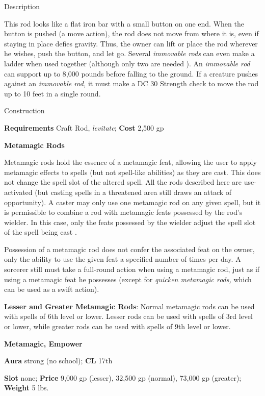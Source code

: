 Description
				
This rod looks like a flat iron bar with a small button on one end. When the button is pushed (a move action), the rod does not move from where it is, even if staying in place defies gravity. Thus, the owner can lift or place the rod wherever he wishes, push the button, and let go. Several \textit{immovable rods }can even make a ladder when used together (although only two 
are needed
). An \textit{immovable rod }can support up to 8,000 pounds before falling to the ground. If a creature pushes against an \textit{immovable rod, }it must make a DC 30 Strength check to move the rod up to 10 feet in a single round. 
				
Construction
				
\textbf{Requirements} Craft Rod, \textit{levitate}; \textbf{Cost }2,500 gp
				
\textbf{Metamagic Rods}
				
Metamagic rods hold the essence of a metamagic feat, allowing the user to apply metamagic effects to spells (but not spell-like abilities) as they are cast. This does not change the spell slot of the altered spell. All the rods described here are use-activated (but casting spells in a threatened area still draws an attack of opportunity). A caster may only use one metamagic rod on any given spell, but it is permissible to combine a rod with metamagic feats possessed by the rod's wielder. In this case, only the feats possessed by the wielder adjust the spell slot of the spell 
being cast
.
				
Possession of a metamagic rod does not confer the associated feat on the owner, only the ability to use the given feat a specified number of times per day. A sorcerer still must take a full-round action when using a metamagic rod, just as if using a metamagic feat he possesses (except for \textit{quicken metamagic rods,} which can be used as a swift action).
				
\textbf{Lesser and Greater Metamagic Rods}: Normal metamagic rods can be used with spells of 6th level or lower. Lesser rods can be used with spells of 3rd level or lower, while greater rods can be used with spells of 9th level or lower. 
				
\textbf{Metamagic, Empower}
				
\textbf{Aura} strong (no school);\textbf{ CL }17th
				
\textbf{Slot} none; \textbf{Price} 9,000 gp (lesser), 32,500 gp (normal), 73,000 gp (greater); \textbf{Weight} 5 lbs.
				
